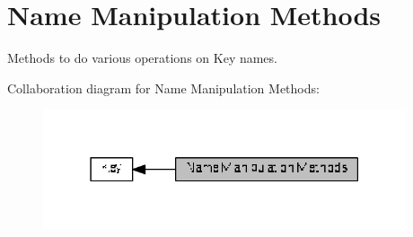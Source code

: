 \hypertarget{group__keyname}{}\section{Name Manipulation Methods}
\label{group__keyname}


Methods to do various operations on Key names.  


Collaboration diagram for Name Manipulation Methods\+:
\nopagebreak
\begin{figure}[H]
\begin{center}
\leavevmode
\includegraphics[width=303pt]{group__keyname}
\end{center}
\end{figure}
